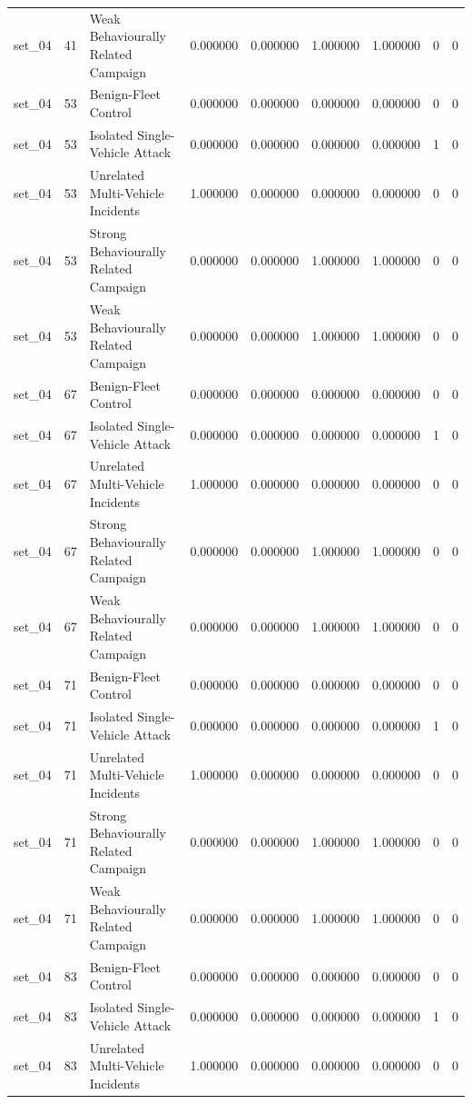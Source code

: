 \begin{tabular}{lrlrrrrrr}
set_04 & 41 & Weak Behaviourally Related Campaign & 0.000000 & 0.000000 & 1.000000 & 1.000000 & 0 & 0 \\
set_04 & 53 & Benign-Fleet Control & 0.000000 & 0.000000 & 0.000000 & 0.000000 & 0 & 0 \\
set_04 & 53 & Isolated Single-Vehicle Attack & 0.000000 & 0.000000 & 0.000000 & 0.000000 & 1 & 0 \\
set_04 & 53 & Unrelated Multi-Vehicle Incidents & 1.000000 & 0.000000 & 0.000000 & 0.000000 & 0 & 0 \\
set_04 & 53 & Strong Behaviourally Related Campaign & 0.000000 & 0.000000 & 1.000000 & 1.000000 & 0 & 0 \\
set_04 & 53 & Weak Behaviourally Related Campaign & 0.000000 & 0.000000 & 1.000000 & 1.000000 & 0 & 0 \\
set_04 & 67 & Benign-Fleet Control & 0.000000 & 0.000000 & 0.000000 & 0.000000 & 0 & 0 \\
set_04 & 67 & Isolated Single-Vehicle Attack & 0.000000 & 0.000000 & 0.000000 & 0.000000 & 1 & 0 \\
set_04 & 67 & Unrelated Multi-Vehicle Incidents & 1.000000 & 0.000000 & 0.000000 & 0.000000 & 0 & 0 \\
set_04 & 67 & Strong Behaviourally Related Campaign & 0.000000 & 0.000000 & 1.000000 & 1.000000 & 0 & 0 \\
set_04 & 67 & Weak Behaviourally Related Campaign & 0.000000 & 0.000000 & 1.000000 & 1.000000 & 0 & 0 \\
set_04 & 71 & Benign-Fleet Control & 0.000000 & 0.000000 & 0.000000 & 0.000000 & 0 & 0 \\
set_04 & 71 & Isolated Single-Vehicle Attack & 0.000000 & 0.000000 & 0.000000 & 0.000000 & 1 & 0 \\
set_04 & 71 & Unrelated Multi-Vehicle Incidents & 1.000000 & 0.000000 & 0.000000 & 0.000000 & 0 & 0 \\
set_04 & 71 & Strong Behaviourally Related Campaign & 0.000000 & 0.000000 & 1.000000 & 1.000000 & 0 & 0 \\
set_04 & 71 & Weak Behaviourally Related Campaign & 0.000000 & 0.000000 & 1.000000 & 1.000000 & 0 & 0 \\
set_04 & 83 & Benign-Fleet Control & 0.000000 & 0.000000 & 0.000000 & 0.000000 & 0 & 0 \\
set_04 & 83 & Isolated Single-Vehicle Attack & 0.000000 & 0.000000 & 0.000000 & 0.000000 & 1 & 0 \\
set_04 & 83 & Unrelated Multi-Vehicle Incidents & 1.000000 & 0.000000 & 0.000000 & 0.000000 & 0 & 0 \\

\end{tabular}

